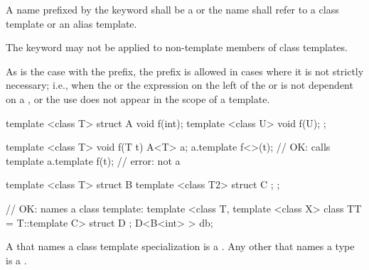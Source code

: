 \pnum
A name prefixed by the keyword
shall be a  or
the name shall refer to a class template or an alias template.
\begin{note}
The keyword
may not be applied to non-template members of class templates.
\end{note}
\begin{note}
As is the case with the
prefix, the
prefix is allowed in cases where it is not strictly
necessary; i.e., when the  or
the expression on the left of
the
\tcode{->}
or
is not dependent on a
, or the use does not appear in the
scope of a template.
\end{note}
\begin{example}
\begin{codeblock}
template <class T> struct A {
  void f(int);
  template <class U> void f(U);
};

template <class T> void f(T t) {
  A<T> a;
  a.template f<>(t);                    // OK: calls template
  a.template f(t);                      // error: not a 
}

template <class T> struct B {
  template <class T2> struct C { };
};

// OK:  names a class template:
template <class T, template <class X> class TT = T::template C> struct D { };
D<B<int> > db;
\end{codeblock}
\end{example}

\pnum
{}%
\begin{note}
A 
that names a class template specialization
is a .
Any other  that names a type
is a .
\end{note}

